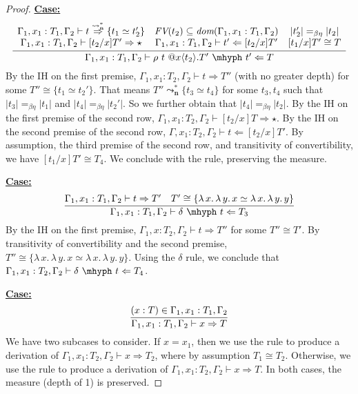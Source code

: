 \documentclass{article}
\newcommand{\absu}[3]{{#1}\, #2.\, #3}
\newcommand{\leadstocs}[0]{\ensuremath{\leadsto_{\mathbf{n}}^*}}
\newcommand{\tpcheck}[0]{\Leftarrow}
\newcommand{\tpsynth}[0]{\Rightarrow}
\newcommand{\tpsynthleads}[0]{\ensuremath{\overset{\leadstocs}{\Rightarrow}}}
\newcommand{\startcase}[1]{\vspace{#1} \noindent\textbf{\underline{Case:}}}
\begin{document}
\begin{proof}
  \startcase{.2cm}
  \[
  \infer{\Gamma_1,x_1:T_1,\Gamma_2 \vdash \rho\ t\ @x\langle t_2 \rangle.T'\ \mhyph\ t' \tpcheck T}
  {
    \begin{array}{ccc}
      \Gamma_1,x_1:T_1,\Gamma_2 \vdash t \tpsynthleads \{t_1 \simeq t_2'\}
      & \textit{FV}(t_2) \subseteq \textit{dom}(\Gamma_1,x_1:T_1,\Gamma_2)
      & |t_2'| =_{\beta\eta} |t_2|
      \\ \Gamma_1,x_1:T_1,\Gamma_2 \vdash [t_2/x] T' \tpsynth \star
      & \Gamma_1,x_1:T_1,\Gamma_2 \vdash t' \tpcheck [t_2/x]T'
      & [t_1/x]T' \cong T
    \end{array}
  }
  \]
  By the IH on the first premise, \(\Gamma_1,x_1:T_2,\Gamma_2 \vdash t \tpsynth
  T''\) (with no greater depth) for some \(T'' \cong \{t_1 \simeq t_2'\}\).
  That means \(T'' \leadstocs \{t_3 \simeq t_4\}\) for some \(t_3,t_4\)
  such that \(|t_3| =_{\beta\eta} |t_1|\) and \(|t_4| =_{\beta\eta} |t_2'|\).
  So we further obtain that \(|t_4| =_{\beta\eta} |t_2|\).
  By the IH on the first premise of the second row, \(\Gamma_1,x_1:T_2,\Gamma_2
  \vdash [t_2/x]T \tpsynth \star\).
  By the IH on the second premise of the second row, \(\Gamma,x_1:T_2,\Gamma_2
  \vdash t \tpcheck [t_2/x]T'\).
  By assumption, the third premise of the second row, and transitivity of
  convertibility, we have \([t_1/x]T' \cong T_4\).
  We conclude with the rule, preserving the measure.

  \startcase{.2cm}
  \[
    \infer{\Gamma_1,x_1:T_1,\Gamma_2\vdash \delta\ \mhyph\ t \tpcheck T_3}
    {
      \Gamma_1,x_1 : T_1,\Gamma_2 \vdash t \tpsynth T'
      \quad T' \cong \{\absu{\lambda}{x}{\absu{\lambda}{y}{x}} \simeq \absu{\lambda}{x}{\absu{\lambda}{y}{y}}\}
    }
  \]
  By the IH on the first premise, \(\Gamma_1,x:T_2,\Gamma_2 \vdash t \tpsynth
  T''\) for some \(T'' \cong T'\).
  By transitivity of convertibility and the second premise, \(T'' \cong
  \{\absu{\lambda}{x}{\absu{\lambda}{y}{x}} \simeq
  \absu{\lambda}{x}{\absu{\lambda}{y}{y}}\}\).
  Using the \(\delta\) rule, we conclude that \(\Gamma_1,x_1:T_2,\Gamma_2 \vdash
  \delta\ \mhyph\ t \tpcheck T_4\).
  
  \startcase{.2cm}
  \[
    \infer{
      \Gamma_1,x_1:T_1,\Gamma_2 \vdash x \tpsynth T
    }{
      (x : T)\in\Gamma_1,x_1 : T_1,\Gamma_2
    }
  \]
  We have two subcases to consider.
  If \(x = x_1\), then we use the rule to produce a derivation of
  \(\Gamma_1,x_1:T_2,\Gamma_2 \vdash x \tpsynth T_2\), where by assumption \(T_1 \cong T_2\).
  Otherwise, we use the rule to produce a derivation of
  \(\Gamma_1,x_1:T_2,\Gamma_2 \vdash x \tpsynth T\).
  In both cases, the measure (depth of 1) is preserved.


\end{proof}
\end{document}
